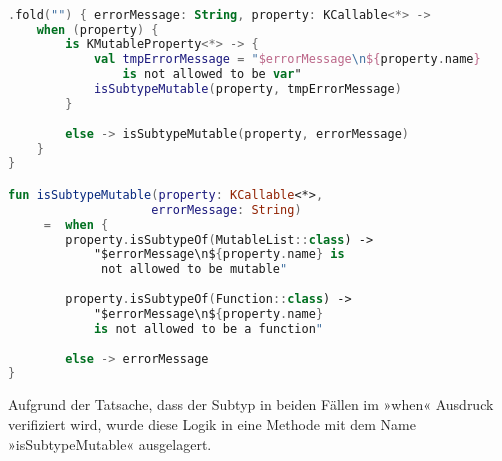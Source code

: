\begin{lstlisting}[caption={fold}, label={lst:fold}, language=Kotlin]

.fold("") { errorMessage: String, property: KCallable<*> ->
	when (property) {
		is KMutableProperty<*> -> {
			val tmpErrorMessage = "$errorMessage\n${property.name} 
				is not allowed to be var"
			isSubtypeMutable(property, tmpErrorMessage)
		}
		
		else -> isSubtypeMutable(property, errorMessage)
	}
}

fun isSubtypeMutable(property: KCallable<*>, 
					errorMessage: String)
	 =	when {
		property.isSubtypeOf(MutableList::class) ->
			"$errorMessage\n${property.name} is 
			 not allowed to be mutable"
	
		property.isSubtypeOf(Function::class) ->
			"$errorMessage\n${property.name} 
			is not allowed to be a function"
	
		else -> errorMessage
}

\end{lstlisting}
\bigskip
Aufgrund der Tatsache, dass der Subtyp in beiden Fällen im »when« Ausdruck verifiziert wird, wurde diese Logik in eine Methode mit dem Name »isSubtypeMutable« ausgelagert.
\\\\ 
